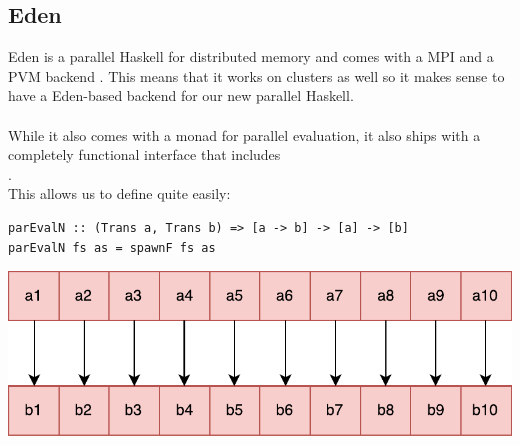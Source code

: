 \subsection{Eden}
Eden  is a parallel Haskell for distributed memory and comes with a MPI and a PVM backend \cite{eden_hackage, Loogen2012, eden_homepage}. This means that it works on clusters as well so it makes sense to have a Eden-based backend for our new parallel Haskell.
\\\\
While it also comes with a monad  for parallel evaluation, it also ships with a completely functional interface that includes
\\
.
\\
This allows us to define  quite easily:

\begin{lstlisting}[frame=htrbl]
parEvalN :: (Trans a, Trans b) => [a -> b] -> [a] -> [b]
parEvalN fs as = spawnF fs as
\end{lstlisting}
\begin{center}
	\includegraphics[scale=0.5]{images/parEvalNEden}
\end{center}